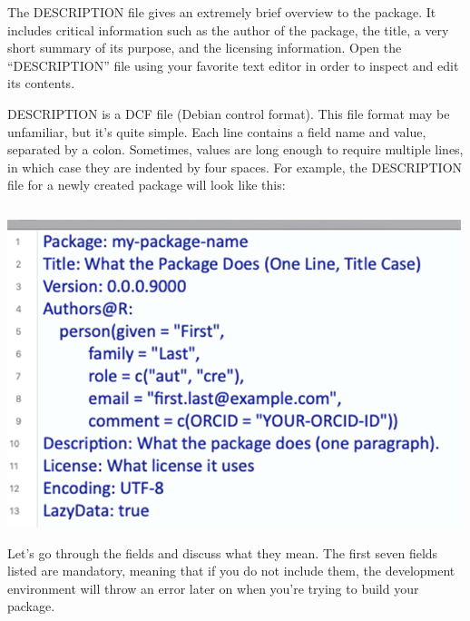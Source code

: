 \documentclass[
]{book}
\begin{document}
The DESCRIPTION file gives an extremely brief overview to the package. It includes critical information such as the author of the package, the title, a very short summary of its purpose, and the licensing information. Open the ``DESCRIPTION'' file using your favorite text editor in order to inspect and edit its contents.

DESCRIPTION is a DCF file (Debian control format). This file format may be unfamiliar, but it's quite simple. Each line contains a field name and value, separated by a colon. Sometimes, values are long enough to require multiple lines, in which case they are indented by four spaces. For example, the DESCRIPTION file for a newly created package will look like this:

\begin{verbatim}
\end{verbatim}

\includegraphics{images/packageSS/description_blank.png}

Let's go through the fields and discuss what they mean. The first seven fields listed are mandatory, meaning that if you do not include them, the development environment will throw an error later on when you're trying to build your package.
\end{document}
